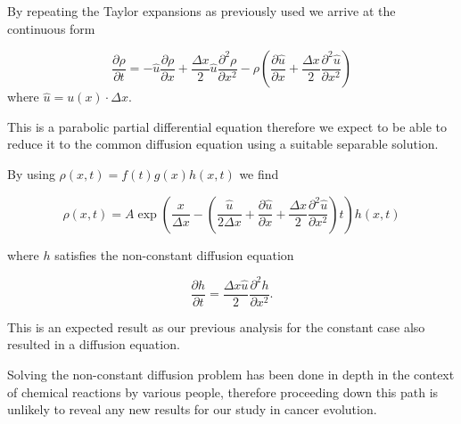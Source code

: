 \documentclass[12pt, a4paper,]{article}
\begin{document}
By repeating the Taylor expansions as previously used we arrive at the continuous form 

\begin{equation}
\frac{\partial \rho}{\partial t} = - \hat{u} \frac{\partial \rho}{\partial x} + \frac{\Delta x}{2} \hat{u} \frac{\partial ^2 \rho}{\partial x ^2} - \rho \left( \frac{\partial \hat{u}}{\partial x} + \frac{\Delta x }{2} \frac{\partial ^2 \hat{u}}{\partial x ^2} \right)
\label{eq:NonConstantContinous}
\end{equation}
where $\hat{u} = u(x) \cdot \Delta x $. 

This is a parabolic partial differential equation therefore we expect to be able to reduce it to the common diffusion equation using a suitable separable solution.

By using $\rho (x ,t ) = f(t) g(x) h(x,t)$ we find

\begin{equation}
\rho (x, t) = A \exp \left(\frac{x}{\Delta x} - \left( \frac{\hat{u}}{2 \Delta x } + \frac{\partial \hat{u}}{\partial x} + \frac{\Delta x }{2} \frac{\partial ^2 \hat{u}}{\partial x ^2} \right) t \right) h (x, t)
\end{equation} 

where $h$ satisfies the non-constant diffusion equation 

\begin{equation}
\frac{\partial h}{ \partial t} = \frac{\Delta x \hat{u}}{2} \frac{\partial ^2 h}{\partial x ^2} .
\end{equation}

This is an expected result as our previous analysis for the constant case also resulted in a diffusion equation. 

Solving the non-constant diffusion problem has been done in depth in the context of chemical reactions by various people, therefore  proceeding down this path is unlikely to reveal any new results for our study in cancer evolution. 





\end{document}
